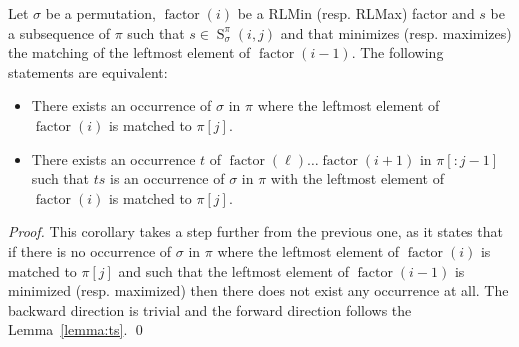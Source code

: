 \documentclass[a4paper]{llncs}
\newcommand{\ptext}{\pi}
\newcommand{\ppattern}{\sigma}
\DeclareMathOperator{\factor}{factor}
\DeclareMathOperator{\SETa}{S}
\newcommand{\SET}[4]{\SETa_{{#1}}^{{#2}}({#3},{#4})}
\begin{document}
\begin{corollary}
\label{corollary:we can chose a matching}
Let $\ppattern$ be a permutation,
$\factor(i)$ be a RLMin (resp. RLMax) factor
and
$s$ be a subsequence of $\pi$ such that $s \in \SET{\ppattern}{\ptext}{i}{j}$ and
that minimizes (resp. maximizes) the matching of the leftmost element of $\factor(i-1)$.
The following statements are equivalent:
\begin{itemize}
	\item There exists an occurrence
	 of $\ppattern$ in $\ptext$ where the leftmost element of $\factor(i)$ is matched to $\ptext[j]$.
	\item There exists an occurrence $t$ of $\factor(\ell)\ldots \factor(i+1)$ in $\ptext[:j-1]$  such that $ts$ is an occurrence of $\ppattern$ in $\ptext$ with the leftmost element of $\factor(i)$ is matched to $\ptext[j]$.
\end{itemize}
\end{corollary}

\begin{proof} %
This corollary takes a step further from the previous one, as it states that if there is no occurrence of $\ppattern$ in $\ptext$ where the leftmost element of $\factor(i)$ is matched to $\ptext[j]$ and such that
the leftmost element of $\factor(i-1)$ is minimized (resp. maximized)
then there does not exist any occurrence at all. The backward direction is trivial and the forward direction follows the Lemma~\ref{lemma:ts}.
\qed
\end{proof}


%
%
%
%



\end{document}

